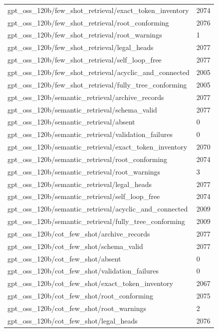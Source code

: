 \begin{tabular}{ll}
gpt\_oss\_120b/few\_shot\_retrieval/exact\_token\_inventory & 2074 \\
gpt\_oss\_120b/few\_shot\_retrieval/root\_conforming & 2076 \\
gpt\_oss\_120b/few\_shot\_retrieval/root\_warnings & 1 \\
gpt\_oss\_120b/few\_shot\_retrieval/legal\_heads & 2077 \\
gpt\_oss\_120b/few\_shot\_retrieval/self\_loop\_free & 2077 \\
gpt\_oss\_120b/few\_shot\_retrieval/acyclic\_and\_connected & 2005 \\
gpt\_oss\_120b/few\_shot\_retrieval/fully\_tree\_conforming & 2005 \\
gpt\_oss\_120b/semantic\_retrieval/archive\_records & 2077 \\
gpt\_oss\_120b/semantic\_retrieval/schema\_valid & 2077 \\
gpt\_oss\_120b/semantic\_retrieval/absent & 0 \\
gpt\_oss\_120b/semantic\_retrieval/validation\_failures & 0 \\
gpt\_oss\_120b/semantic\_retrieval/exact\_token\_inventory & 2070 \\
gpt\_oss\_120b/semantic\_retrieval/root\_conforming & 2074 \\
gpt\_oss\_120b/semantic\_retrieval/root\_warnings & 3 \\
gpt\_oss\_120b/semantic\_retrieval/legal\_heads & 2077 \\
gpt\_oss\_120b/semantic\_retrieval/self\_loop\_free & 2074 \\
gpt\_oss\_120b/semantic\_retrieval/acyclic\_and\_connected & 2009 \\
gpt\_oss\_120b/semantic\_retrieval/fully\_tree\_conforming & 2009 \\
gpt\_oss\_120b/cot\_few\_shot/archive\_records & 2077 \\
gpt\_oss\_120b/cot\_few\_shot/schema\_valid & 2077 \\
gpt\_oss\_120b/cot\_few\_shot/absent & 0 \\
gpt\_oss\_120b/cot\_few\_shot/validation\_failures & 0 \\
gpt\_oss\_120b/cot\_few\_shot/exact\_token\_inventory & 2067 \\
gpt\_oss\_120b/cot\_few\_shot/root\_conforming & 2075 \\
gpt\_oss\_120b/cot\_few\_shot/root\_warnings & 2 \\
gpt\_oss\_120b/cot\_few\_shot/legal\_heads & 2076 \\

\end{tabular}
